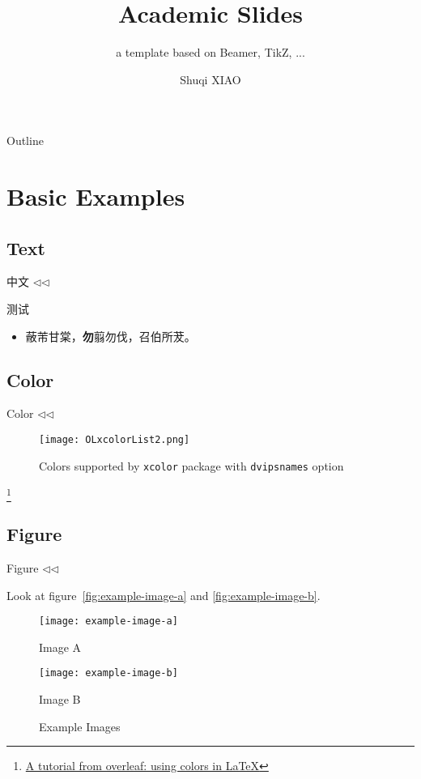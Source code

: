 \documentclass[
    10pt,
    aspectratio=1610,
    xcolor={dvipsnames,pst},
]{beamer}
\title{Academic Slides}
\subtitle{a template based on Beamer, TikZ, ...}
\author{Shuqi XIAO}
\newenvironment{Frame}[1]{
    \begin{frame}{#1 \hspace{0pt plus 1filll} \scriptsize \(\triangleleft\)\;\subsecname\;\(\triangleleft\)\;\secname}\vspace*{\fill}
}{\vspace*{\fill}\end{frame}}
\newcommand\blfootnote[1]{%
  \begingroup
  \renewcommand\thefootnote{}\footnote{#1}%
  \addtocounter{footnote}{-1}%
  \endgroup
}
\begin{document}
\maketitle

\begin{frame}{Outline}
	\tableofcontents
\end{frame}

\section{Basic Examples}

\subsection{Text}
\begin{Frame}{中文}
	\par 测试
	\begin{itemize}
		\setlength{\itemsep}{1.5ex}
		\item 蔽芾甘棠，\textbf{勿}翦{\large 勿}伐，{\scriptsize 召}伯所{\huge 茇}。
	\end{itemize}
\end{Frame}
\subsection{Color}
\begin{Frame}{Color}
	\begin{figure}[htbp]
		\centering
		\texttt{[image: OLxcolorList2.png]}
		\vspace*{0.5ex}
		\caption{Colors supported by \texttt{xcolor} package with \texttt{dvipsnames} option}
	\end{figure}
	\blfootnote{\href{https://es.overleaf.com/learn/latex/Using_colors_in_LaTeX}{A tutorial from overleaf: using colors in \LaTeX}}
\end{Frame}

\subsection{Figure}
\begin{Frame}{Figure}
	Look at figure~\ref{fig:example-image-a} and \ref{fig:example-image-b}.
	\vspace*{1em}
	\begin{figure}[htbp]
		\begin{minipage}[c]{0.45\linewidth}
			\centering
			\texttt{[image: example-image-a]}
			\vspace*{0.5ex}
			\caption{Image A}
			\label{fig:example-image-a}
		\end{minipage}
		\hspace{\fill}
		\begin{minipage}[c]{0.45\linewidth}
			\centering
			\texttt{[image: example-image-b]}
			\vspace*{0.5ex}
			\caption{Image B}
			\label{fig:example-image-b}
		\end{minipage}
		\vspace*{0.5ex}
		\caption*{Example Images}
		\label{fig:example-images}
	\end{figure}
\end{Frame}
\end{document}
